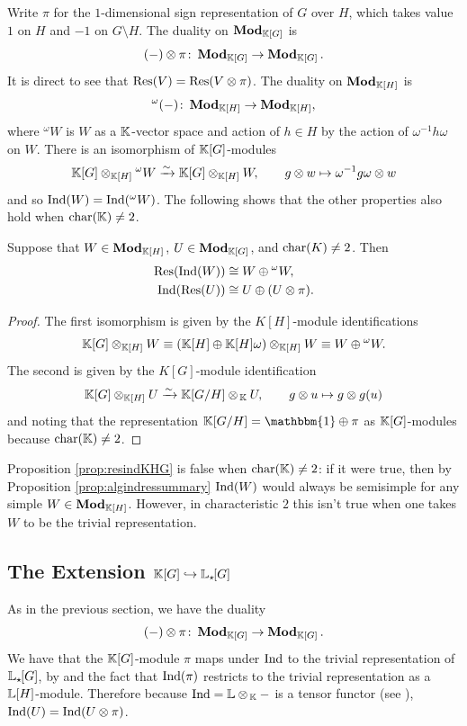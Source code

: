 Write $\pi$ for the $1$-dimensional sign representation of $G$ over $H$, which takes value $1$ on $H$ and $-1$ on $G \setminus H$. The duality on $\operatorname{\mathbf{Mod}}_{{\mathbb K}[G]}$ is 
\[
(-) \otimes \pi \colon \operatorname{\mathbf{Mod}}_{{\mathbb K}[G]} \rightarrow \operatorname{\mathbf{Mod}}_{{\mathbb K}[G]}.
\]
It is direct to see that $\Res(V) = \Res(V \otimes \pi)$. The duality on $\operatorname{\mathbf{Mod}}_{{\mathbb K}[H]}$ is
\[
{}^\omega(-) \colon \operatorname{\mathbf{Mod}}_{{\mathbb K}[H]} \rightarrow \operatorname{\mathbf{Mod}}_{{\mathbb K}[H]},
\]
where ${}^{\omega} W$ is $W$ as a ${\mathbb K}$-vector space and action of $h \in H$ by the action of $\omega^{-1} h \omega$ on $W$. There is an isomorphism of ${\mathbb K}[G]$-modules
\[
    {\mathbb K}[G] \otimes_{{\mathbb K}[H]} {}^{\omega} W \xrightarrow{\sim} {\mathbb K}[G] \otimes_{{\mathbb K}[H]} W, \qquad g \otimes w \mapsto \omega^{-1} g \omega \otimes w
\]
and so $\operatorname{Ind}(W) = \operatorname{Ind}({}^{\omega} W)$. The following shows that the other properties also hold when $\operatorname{char}({\mathbb K}) \neq 2$.

\begin{prop}\label{prop:resindKHG}
Suppose that $W \in \operatorname{\mathbf{Mod}}_{{\mathbb K}[H]}$, $U \in \operatorname{\mathbf{Mod}}_{{\mathbb K}[G]}$, and $\operatorname{char}(K) \neq 2$. Then 
\begin{align*}
    \Res(\Ind(W)) &\cong W \oplus {}^{\omega} W, \\
    \Ind(\Res(U)) &\cong U \oplus (U \otimes \pi).
\end{align*}
\end{prop}

\begin{proof}
    The first isomorphism is given by the $K[H]$-module identifications
    \[  
        {\mathbb K}[G] \otimes_{{\mathbb K}[H]} W \equiv ({\mathbb K}[H] \oplus {\mathbb K}[H] \omega) \otimes_{{\mathbb K}[H]} W \equiv W \oplus {}^{\omega} W.
    \]
    The second is given by the $K[G]$-module identification
    \[
        {\mathbb K}[G] \otimes_{{\mathbb K}[H]} U \xrightarrow{\sim} {\mathbb K}[G/H] \otimes_{\, {\mathbb K}} U, \qquad g \otimes u \mapsto g \otimes g(u)
    \]
    and noting that the representation $\bK[G/H] = \mathbbm{1} \oplus \pi$ as ${\mathbb K}[G]$-modules because $\operatorname{char}({\mathbb K}) \neq 2$.
\end{proof}

\begin{remark}
    Proposition \ref{prop:resindKHG} is false when $\operatorname{char}({\mathbb K}) \neq 2$: if it were true, then by Proposition \ref{prop:algindressummary} $\operatorname{Ind}(W)$ would always be semisimple for any simple  $W \in \operatorname{\mathbf{Mod}}_{{\mathbb K}[H]}$. However, in characteristic $2$ this isn't true when one takes $W$ to be the trivial representation.
\end{remark}

\subsection{The Extension ${\mathbb K}[G] \hookrightarrow {\mathbb L}_{\star \hspace{-0.1em}}[G]$} As in the previous section, we have the duality
\[
(-) \otimes \pi \colon \operatorname{\mathbf{Mod}}_{{\mathbb K}[G]} \rightarrow \operatorname{\mathbf{Mod}}_{{\mathbb K}[G]}.
\]
We have that the ${\mathbb K}[G]$-module $\pi$ maps under $\operatorname{Ind}$ to the trivial representation of ${\mathbb L}_{\star \hspace{-0.1em}}[G]$, by \cite[Thm.\ A]{TAYSchur} and the fact that $\operatorname{Ind}(\pi)$ restricts to the trivial representation as a ${\mathbb L}[H]$-module. Therefore because $\operatorname{Ind} = {\mathbb L} \otimes_{\, {\mathbb K}} -$ is a tensor functor (see \cite[\S4.1]{TAYSchur}), $\operatorname{Ind}(U) = \operatorname{Ind}(U \otimes \pi)$.

